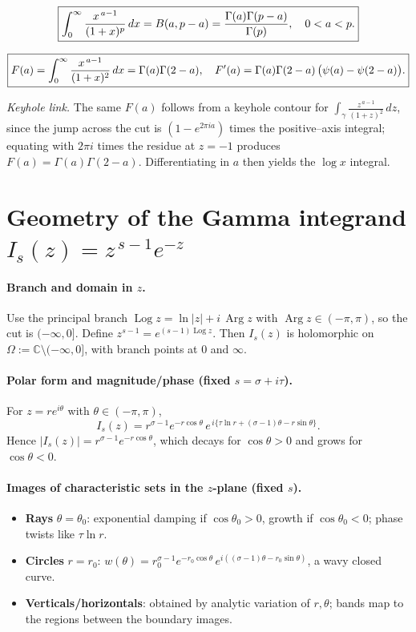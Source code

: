 \documentclass[12pt,a4paper]{article}
\DeclareMathOperator{\Arg}{Arg}
\DeclareMathOperator{\Log}{Log}
\newcommand{\C}{\mathbb{C}}
\begin{document}
\bigskip

\[
\boxed{%
\int_{0}^{\infty}\frac{x^{\,a-1}}{(1+x)^{p}}\,dx
=B(a,p-a)=\frac{\Gamma(a)\Gamma(p-a)}{\Gamma(p)},
\quad
0<a<p.}
\]

\bigskip

\[
\boxed{%
F(a)=\int_{0}^{\infty}\frac{x^{\,a-1}}{(1+x)^2}\,dx
=\Gamma(a)\Gamma(2-a),\quad
F'(a)=\Gamma(a)\Gamma(2-a)\,\bigl(\psi(a)-\psi(2-a)\bigr).}
\]

\medskip
\noindent
\emph{Keyhole link.} The same $F(a)$ follows from a keyhole contour for
$\displaystyle \int_{\gamma}\frac{z^{\,a-1}}{(1+z)^2}\,dz$,
since the jump across the cut is $(1-e^{2\pi i a})$ times the positive–axis integral;
equating with $2\pi i$ times the residue at $z=-1$ produces $F(a)=\Gamma(a)\Gamma(2-a)$.
Differentiating in $a$ then yields the $\log x$ integral.


\section*{Geometry of the Gamma integrand \(I_s(z)=z^{\,s-1}e^{-z}\)}

\paragraph{Branch and domain in \(z\).}
Use the principal branch \(\Log z=\ln|z|+i\,\Arg z\) with \(\Arg z\in(-\pi,\pi)\), so the cut is \((-\infty,0]\).
Define \(z^{s-1}=e^{(s-1)\Log z}\).
Then \(I_s(z)\) is holomorphic on \(\Omega:=\C\setminus(-\infty,0]\), with branch points at \(0\) and \(\infty\).

\bigskip

\paragraph{Polar form and magnitude/phase (fixed \(s=\sigma+i\tau\)).}
For \(z=re^{i\theta}\) with \(\theta\in(-\pi,\pi)\),
\[
I_s(z)=r^{\sigma-1}e^{-r\cos\theta}\,
e^{\,i\{\tau\ln r+(\sigma-1)\theta-r\sin\theta\}}.
\]
Hence \(|I_s(z)|=r^{\sigma-1}e^{-r\cos\theta}\), which decays for \(\cos\theta>0\) and grows for \(\cos\theta<0\).

\bigskip

\paragraph{Images of characteristic sets in the \(z\)-plane (fixed \(s\)).}
\begin{itemize}
\item \textbf{Rays} \(\theta=\theta_0\): exponential damping if \(\cos\theta_0>0\), growth if \(\cos\theta_0<0\); phase twists like \(\tau\ln r\).
\item \textbf{Circles} \(r=r_0\): \(w(\theta)=r_0^{\sigma-1}e^{-r_0\cos\theta}\,e^{i((\sigma-1)\theta-r_0\sin\theta)}\), a wavy closed curve.
\item \textbf{Verticals/horizontals}: obtained by analytic variation of \(r,\theta\); bands map to the regions between the boundary images.
\end{itemize}
\end{document}
